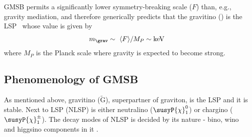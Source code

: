 GMSB permits a significantly lower symmetry-breaking scale ($F$) than, e.g., gravity mediation, and therefore generically predicts that the gravitino (\grav) is the LSP~\cite{Meade:2008wd,PhysRevLett.38.1433,CREMMER1978231} whose value is given by
\begin{equation}
\label{massGrav}
m_{\grav}  \sim \ \langle F \rangle/M_P \sim \mathrm{keV}
\end{equation}
where $M_P$ is the Planck scale where gravity is expected to become strong.

\subsection{Phenomenology of GMSB}
As mentioned above, gravitino ($\tilde{\mathrm{G}}$), superpartner of graviton, is the LSP and it is stable. Next to LSP (NLSP) is either neutralino ($\susyP{\chi}_{1}^{0}$) or chargino ($\susyP{\chi}_{1}^{\pm}$). The decay modes of NLSP is decided by its nature - bino, wino and higgsino components in it \cite{Knapen:2016exe}.
